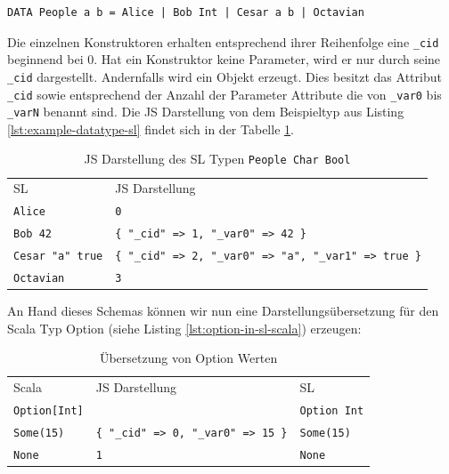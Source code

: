 \documentclass[12pt]{scrreprt}
\begin{document}
\begin{lstlisting}[caption=Beispiel eines selbstedefinierten Typs, label=lst:example-datatype-sl]
DATA People a b = Alice | Bob Int | Cesar a b | Octavian
\end{lstlisting}

Die einzelnen Konstruktoren erhalten entsprechend ihrer Reihenfolge eine \lstinline!_cid! beginnend bei $0$. Hat ein Konstruktor keine Parameter, wird er nur durch seine \lstinline!_cid! dargestellt. Andernfalls wird ein Objekt erzeugt. Dies besitzt das Attribut \lstinline!_cid! sowie entsprechend der Anzahl der Parameter Attribute die von \lstinline!_var0! bis \lstinline!_varN! benannt sind. Die JS Darstellung von dem Beispieltyp aus Listing \ref{lst:example-datatype-sl} findet sich in der Tabelle \ref{tab:js-code-of-people}.

\begin{table}[h]
\caption{JS Darstellung des \ac{SL} Typen \lstinline!People Char Bool!}
\centering
\begin{tabular}{ll}
 \ac{SL}              &  \ac{JS} Darstellung \\
\lstinline!Alice!           &  \lstinline!0! \\
\lstinline!Bob 42!          &  \lstinline!{ "_cid" => 1, "_var0" => 42 }! \\
\lstinline!Cesar "a" true!  &  \lstinline!{ "_cid" => 2, "_var0" => "a", "_var1" => true }! \\
\lstinline!Octavian!        &  \lstinline!3! \\
\end{tabular}
\label{tab:js-code-of-people}
\end{table}

An Hand dieses Schemas können wir nun eine Darstellungsübersetzung für den Scala Typ Option (siehe Listing \ref{lst:option-in-sl-scala}) erzeugen:

\begin{table}[h]
\caption{Übersetzung von Option Werten}
\centering
\begin{tabular}{lll}
Scala                   & \ac{JS} Darstellung                        & SL \\

\lstinline!Option[Int]! &                                            & \lstinline!Option Int! \\

\lstinline!Some(15)!    & \lstinline!{ "_cid" => 0, "_var0" => 15 }! & \lstinline!Some(15)! \\
\lstinline!None!        & \lstinline!1!                              &  \lstinline!None! \\
\end{tabular}
\end{table}
\end{document}
